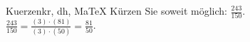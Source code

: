 \begin{MAufgabe}{Kuerzen}{kr, dh, MaTeX}
K\"urzen Sie soweit m\"oglich: $\frac{243}{150}$.\\ 
\ifLsg\MLoesung
\quad $\frac{243}{150}=\frac{(3)\cdot(81)}{(3)\cdot(50)}=\frac{81}{50}$.\else\relax\fi
 \end{MAufgabe}